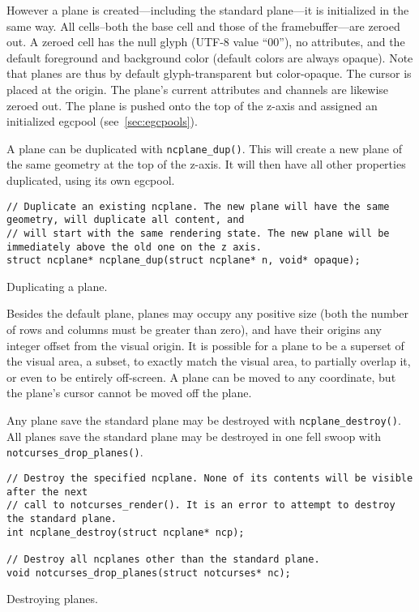 However a plane is created---including the standard plane---it is initialized
in the same way. All cells--both the base cell and those of the
framebuffer---are zeroed out. A zeroed cell has the null glyph (UTF-8
value ``00''), no attributes, and the default foreground and background color
(default colors are always opaque). Note that planes are thus by default
glyph-transparent but color-opaque. The cursor is placed at the origin. The
plane's current attributes and channels are likewise zeroed out. The plane is
pushed onto the top of the z-axis and assigned an initialized egcpool
(see~\ref{sec:egcpools}).

A plane can be duplicated with \texttt{ncplane\_dup()}. This will create a new
plane of the same geometry at the top of the z-axis. It will then have all
other properties duplicated, using its own egcpool.
\begin{listing}[!htb]
\begin{verbatim}
// Duplicate an existing ncplane. The new plane will have the same geometry, will duplicate all content, and
// will start with the same rendering state. The new plane will be immediately above the old one on the z axis.
struct ncplane* ncplane_dup(struct ncplane* n, void* opaque);
\end{verbatim}
\caption{Duplicating a plane.}
\end{listing}

Besides the default plane, planes may occupy any positive size (both the number
of rows and columns must be greater than zero), and have their origins any
integer offset from the visual origin. It is possible for a plane to be a
superset of the visual area, a subset, to exactly match the visual area, to
partially overlap it, or even to be entirely off-screen. A plane can be
moved to any coordinate, but the plane's cursor cannot be moved off the plane.

Any plane save the standard plane may be destroyed with \texttt{ncplane\_destroy()}.
All planes save the standard plane may be destroyed in one fell swoop with
\texttt{notcurses\_drop\_planes()}.
\begin{listing}[!htb]
\begin{verbatim}
// Destroy the specified ncplane. None of its contents will be visible after the next
// call to notcurses_render(). It is an error to attempt to destroy the standard plane.
int ncplane_destroy(struct ncplane* ncp);

// Destroy all ncplanes other than the standard plane.
void notcurses_drop_planes(struct notcurses* nc);
\end{verbatim}
\caption{Destroying planes.}
\end{listing}

